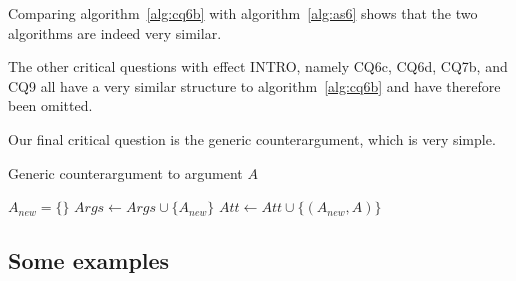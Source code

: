 \rationale{} Comparing algorithm~\ref{alg:cq6b} with algorithm~\ref{alg:as6} shows that the two algorithms are indeed very similar. 

The other critical questions with effect INTRO, namely CQ6c, CQ6d, CQ7b, and CQ9 all have a very similar structure to algorithm~\ref{alg:cq6b} and have therefore been omitted.

Our final critical question is the generic counterargument, which is very simple.

\begin{algorithm}[h]
  \caption{Generic counterargument to argument $A$}\label{alg:cq6b}
  \begin{algorithmic}[1]
    \State $A_{new} = \{\}$
    \State $Args \gets Args \cup \{A_{new}\}$
    \State $Att \gets Att \cup \{(A_{new},A)\}$
    \EndProcedure
  \end{algorithmic}
\end{algorithm}

\subsection{Some examples}

